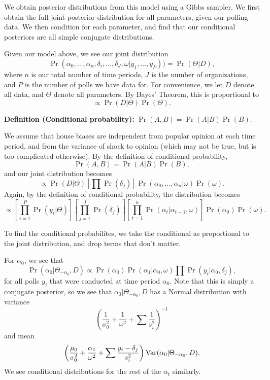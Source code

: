 \documentclass[thesis.tex]{subfiles}
\begin{document}
We obtain posterior distributions from this model using a Gibbs sampler. We first obtain the full joint posterior distribution for all parameters, given our polling data. We then condition for each parameter, and find that our conditional posteriors are all simple conjugate distributions.

Given our model above, we see our joint distribution \[
	\Pr(\alpha_0, \ldots, \alpha_n, \delta_i, \ldots, \delta_J, \omega | y_1, \ldots, y_P)) = \Pr(\Theta | D),
\] where \(n\) is our total number of time periods, \(J\) is the number of organizations, and \(P\) is the number of polls we have data for. For convenience, we let \(D\) denote all data, and \(\Theta\) denote all parameters. By Bayes' Theorem, this is proportional to \[
	\propto \Pr(D | \Theta ) \Pr(\Theta).
\]

\bigskip

\noindent\textbf{Definition (Conditional probability):} \(\Pr(A, B) = \Pr(A | B)\Pr(B)\).

\bigskip

We assume that house biases are independent from popular opinion at each time period, and from the variance of shock to opinion (which may not be true, but is too complicated otherwise). By the definition of conditional probability, \[
	\Pr(A, B) = \Pr(A | B)\Pr(B),
\] and our joint distribution becomes \[
	\propto \Pr(D | \Theta) \left[\prod \Pr(\delta_j) \right] \Pr(\alpha_0, \ldots, \alpha_n | \omega) \Pr(\omega).
\] Again, by the definition of conditional probability, the distribution becomes \[
	\propto \left[\prod_{i=1}^P \Pr(y_i | \Theta)\right] \left[\prod_{j=1}^J \Pr(\delta_j) \right]\left[\prod_{t=1}^n \Pr(\alpha_t | \alpha_{t-1}, \omega)\right] \Pr(\alpha_0) \Pr(\omega).
\]

To find the conditional probabilites, we take the conditional as proportional to the joint distribution, and drop terms that don't matter.

For \(\alpha_0\), we see that \[
	\Pr(\alpha_0 | \Theta_{-\alpha_0}, D) \propto \Pr(\alpha_0)\Pr(\alpha_1 | \alpha_0, \omega)\prod \Pr(y_i | \alpha_0, \delta_j),
\] for all polls \(y_i\) that were conducted at time period \(\alpha_0\). Note that this is simply a conjugate posterior, so we see that \(\alpha_0 | \Theta_{-\alpha_0}, D\) has a Normal distribution with variance \[
\left(\frac{1}{\sigma^2_0} + \frac{1}{\omega^2} + \sum\frac{1}{s_i^2}\right)^{-1}
\] and mean \[
	\left(\frac{\mu_0}{\sigma^2_0} + \frac{\alpha_1}{\omega^2} + \sum \frac{y_i - \delta_j}{s_i^2}\right)\operatorname{Var}(\alpha_0 | \Theta_{-\alpha_0}, D).
\] We see conditional distributions for the rest of the \(\alpha_t\) similarly.
\end{document}
